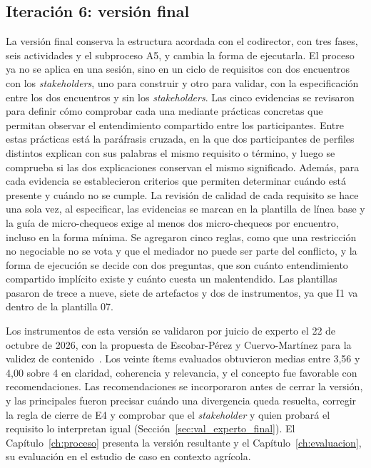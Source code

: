 \documentclass[12pt,letterpaper,oneside]{report}
\begin{document}
\subsection{Iteración 6: versión final}
La versión final conserva la estructura acordada con el codirector, con tres
fases, seis actividades y el subproceso A5, y cambia la forma de ejecutarla. El
proceso ya no se aplica en una sesión, sino en un ciclo de requisitos con dos
encuentros con los \textit{stakeholders}, uno para construir y otro para
validar, con la especificación entre los dos encuentros y sin los \textit{stakeholders}.
Las cinco evidencias se revisaron para definir cómo comprobar cada una mediante prácticas 
concretas que permitan observar el entendimiento compartido entre los participantes. 
Entre estas prácticas está la paráfrasis cruzada, en la que dos participantes
de perfiles distintos explican con sus palabras el mismo requisito o término, y
luego se comprueba si las dos explicaciones conservan el mismo significado. 
Además, para cada evidencia se establecieron 
criterios que permiten determinar cuándo está presente y cuándo no se cumple. 
La revisión de
calidad de cada requisito se hace una sola vez, al especificar, las evidencias
se marcan en la plantilla de línea base y la guía de micro-chequeos exige al
menos dos micro-chequeos por encuentro, incluso en la forma mínima. Se agregaron cinco reglas, como que una restricción no
negociable no se vota y que el mediador no puede ser parte del conflicto, y la
forma de ejecución se decide con dos preguntas, que son cuánto entendimiento compartido
implícito existe y cuánto cuesta un malentendido. Las plantillas pasaron de
trece a nueve, siete de artefactos y dos de instrumentos, ya que I1 va dentro de
la plantilla 07.

Los instrumentos de esta versión se validaron por juicio de experto el 22 de
octubre de 2026, con la propuesta de Escobar-Pérez y Cuervo-Martínez para la
validez de contenido~\cite{escobar2008validez}. Los veinte ítems evaluados
obtuvieron medias entre 3,56 y 4,00 sobre 4 en claridad, coherencia y
relevancia, y el concepto fue favorable con recomendaciones. Las recomendaciones
se incorporaron antes de cerrar la versión, y las principales fueron precisar
cuándo una divergencia queda resuelta, corregir la regla de cierre de E4 y
comprobar que el \textit{stakeholder} y quien probará el requisito lo
interpretan igual (Sección~\ref{sec:val_experto_final}). El
Capítulo~\ref{ch:proceso} presenta la versión resultante y el
Capítulo~\ref{ch:evaluacion}, su evaluación en el estudio de caso en contexto
agrícola.
\end{document}
